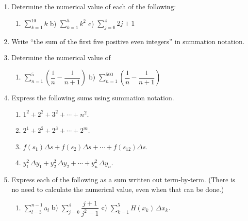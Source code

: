 \begin{enumerate}
\item Determine the numerical value of each of the following:


  \begin{enumerate}
  \item ${\displaystyle \sum_{k = 1}^{10} k}$  \hfill
b) ${\displaystyle \sum_{k = 1}^5 k^2}$ \hfill 
c) ${\displaystyle \sum_{j = 0}^4 2j + 1}$ \hfill \mbox{}




\end{enumerate}
\item Write ``the sum of the first five positive even integers'' in
summation notation.





\item Determine the numerical value of


  \begin{enumerate}
  \item ${\displaystyle \sum_{n = 1}^5
	\left(\dfrac{1}{n} - \dfrac{1}{n+1}\right)}$ \hfill
b) ${\displaystyle \sum_{n = 1}^{500} 
	\left(\dfrac{1}{n} - \dfrac{1}{n+1}\right)}$\hfill \mbox{}


\end{enumerate}
\item Express the following sums using summation notation.

  \begin{enumerate}
  \item $1^2 + 2^2 + 3^2 + \cdots + n^2$.

  \item $2^1 + 2^2 + 2^3 + \cdots + 2^m$.

  \item $f(s_1)\Delta s + f(s_2)\Delta s + \cdots +
	f(s_{12})\Delta s$.

  \item $y_1^2\,\Delta y_1 + y_2^2\,\Delta y_2 + \cdots +
	y_n^2\,\Delta y_n$.


\end{enumerate}
\item Express each of the following as a sum written out term-by-term.
(There is no need to calculate the numerical value, even when that can
be done.)


  \begin{enumerate}
  \item ${\displaystyle \sum_{l = 3}^{n-1} a_l}$ \hfill
b)  ${\displaystyle \sum_{j = 0}^4 \dfrac{j+1}{j^2 + 1}}$
c) ${\displaystyle \sum_{k = 1}^5 H(x_k)\,\Delta x_k}$. \hfill \mbox{}



\end{enumerate}
\end{enumerate}
